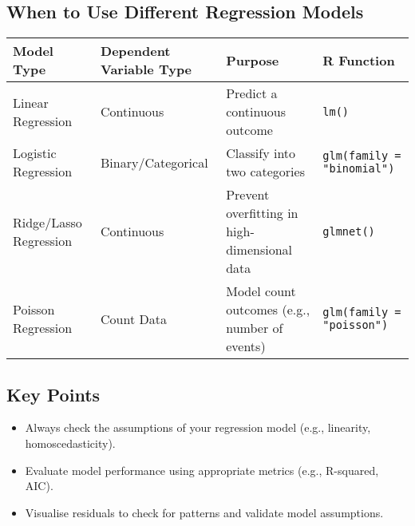 \subsection{When to Use Different Regression Models}

\begin{tabularx}{\textwidth}{|l|X|X|X|}
\hline
\textbf{Model Type} & \textbf{Dependent Variable Type} & \textbf{Purpose} & \textbf{R Function} \\
\hline
Linear Regression & Continuous & Predict a continuous outcome & \texttt{lm()} \\
\hline
Logistic Regression & Binary/Categorical & Classify into two categories & \texttt{glm(family = "binomial")} \\
\hline
Ridge/Lasso Regression & Continuous & Prevent overfitting in high-dimensional data & \texttt{glmnet()} \\
\hline
Poisson Regression & Count Data & Model count outcomes (e.g., number of events) & \texttt{glm(family = "poisson")} \\
\hline
\end{tabularx}

\subsection{Key Points}
\begin{itemize}
    \item Always check the assumptions of your regression model (e.g., linearity, homoscedasticity).
    \item Evaluate model performance using appropriate metrics (e.g., R-squared, AIC).
    \item Visualise residuals to check for patterns and validate model assumptions.
\end{itemize}
